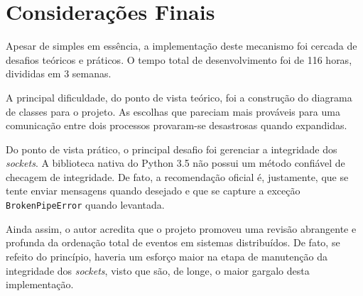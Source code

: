 \documentclass[a4paper,12pt]{article}
\begin{document}
        \section{Considerações Finais}
        
        Apesar de simples em essência, a implementação deste mecanismo foi cercada de desafios teóricos e práticos.
        O tempo total de desenvolvimento foi de 116 horas, divididas em 3 semanas. 
        
        A principal dificuldade, do ponto de vista teórico, foi a construção do diagrama de classes para o projeto.
        As escolhas que pareciam mais prováveis para uma comunicação entre dois processos provaram-se desastrosas quando expandidas.

        Do ponto de vista prático, o principal desafio foi gerenciar a integridade dos \emph{sockets}.
        A biblioteca nativa do Python 3.5 não possui um método confiável de checagem de integridade.
        De fato, a recomendação oficial é, justamente, que se tente enviar mensagens quando desejado e que se capture a exceção \texttt{BrokenPipeError} quando levantada.

        Ainda assim, o autor acredita que o projeto promoveu uma revisão abrangente e profunda da ordenação total de eventos em sistemas distribuídos.
        De fato, se refeito do princípio, haveria um esforço maior na etapa de manutenção da integridade dos \emph{sockets}, visto que são, de longe, o maior gargalo desta implementação.


        
        
        
        


    
\end{document}
